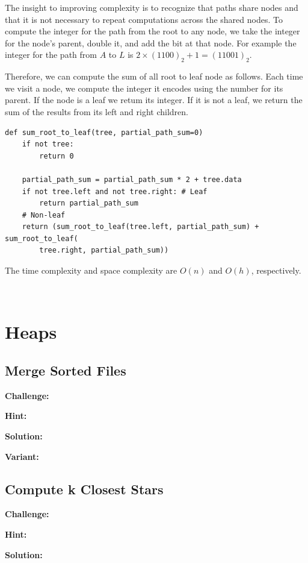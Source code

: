 \documentclass[11pt,a4paper]{article}
\begin{document}
The insight to improving complexity is to recognize that paths share nodes and
that it is not necessary to repeat computations across the shared nodes. To
compute the integer for the path from the root to any node, we take the integer
for the node's parent, double it, and add the bit at that node. For example the
integer for the path from $A$ to $L$ is $2 \times (1100)_2 + 1 = (11001)_2$.

Therefore, we can compute the sum of all root to leaf node as follows. Each time
we visit a node, we compute the integer it encodes using the number for its
parent. If the node is a leaf we retum its integer. If it is not a leaf, we
return the sum of the results from its left and right children.

\begin{verbatim}
def sum_root_to_leaf(tree, partial_path_sum=0) 
    if not tree:
        return 0

    partial_path_sum = partial_path_sum * 2 + tree.data 
    if not tree.left and not tree.right: # Leaf
        return partial_path_sum
    # Non-leaf
    return (sum_root_to_leaf(tree.left, partial_path_sum) + sum_root_to_leaf(
        tree.right, partial_path_sum))
\end{verbatim}  
  
The time complexity and space complexity are $O(n)$ and $O(h)$, respectively.

\ %

\section{Heaps}

\subsection{Merge Sorted Files}

\textbf{Challenge:} 

\textbf{Hint:} 

\textbf{Solution:} 

\textbf{Variant:} 

\subsection{Compute k Closest Stars}

\textbf{Challenge:} 

\textbf{Hint:} 

\textbf{Solution:} 
\end{document}
